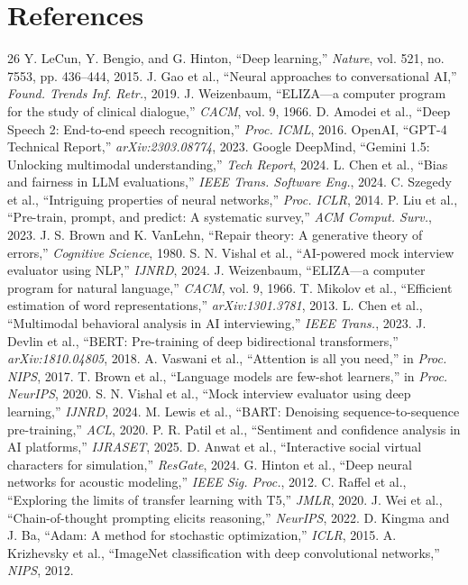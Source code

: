 \documentclass[conference]{IEEEtran}
\begin{document}
\section{References}
\begin{thebibliography}{26}
 Y. LeCun, Y. Bengio, and G. Hinton, ``Deep learning,'' \textit{Nature}, vol. 521, no. 7553, pp. 436--444, 2015.
 J. Gao et al., ``Neural approaches to conversational AI,'' \textit{Found. Trends Inf. Retr.}, 2019.
 J. Weizenbaum, ``ELIZA---a computer program for the study of clinical dialogue,'' \textit{CACM}, vol. 9, 1966.
 D. Amodei et al., ``Deep Speech 2: End-to-end speech recognition,'' \textit{Proc. ICML}, 2016.
 OpenAI, ``GPT-4 Technical Report,'' \textit{arXiv:2303.08774}, 2023.
 Google DeepMind, ``Gemini 1.5: Unlocking multimodal understanding,'' \textit{Tech Report}, 2024.
 L. Chen et al., ``Bias and fairness in LLM evaluations,'' \textit{IEEE Trans. Software Eng.}, 2024.
 C. Szegedy et al., ``Intriguing properties of neural networks,'' \textit{Proc. ICLR}, 2014.
 P. Liu et al., ``Pre-train, prompt, and predict: A systematic survey,'' \textit{ACM Comput. Surv.}, 2023.
 J. S. Brown and K. VanLehn, ``Repair theory: A generative theory of errors,'' \textit{Cognitive Science}, 1980.
 S. N. Vishal et al., ``AI-powered mock interview evaluator using NLP,'' \textit{IJNRD}, 2024.
 J. Weizenbaum, ``ELIZA---a computer program for natural language,'' \textit{CACM}, vol. 9, 1966.
 T. Mikolov et al., ``Efficient estimation of word representations,'' \textit{arXiv:1301.3781}, 2013.
 L. Chen et al., ``Multimodal behavioral analysis in AI interviewing,'' \textit{IEEE Trans.}, 2023.
 J. Devlin et al., ``BERT: Pre-training of deep bidirectional transformers,'' \textit{arXiv:1810.04805}, 2018.
 A. Vaswani et al., ``Attention is all you need,'' in \textit{Proc. NIPS}, 2017.
 T. Brown et al., ``Language models are few-shot learners,'' in \textit{Proc. NeurIPS}, 2020.
 S. N. Vishal et al., ``Mock interview evaluator using deep learning,'' \textit{IJNRD}, 2024.
 M. Lewis et al., ``BART: Denoising sequence-to-sequence pre-training,'' \textit{ACL}, 2020.
 P. R. Patil et al., ``Sentiment and confidence analysis in AI platforms,'' \textit{IJRASET}, 2025.
 D. Anwat et al., ``Interactive social virtual characters for simulation,'' \textit{ResGate}, 2024.
 G. Hinton et al., ``Deep neural networks for acoustic modeling,'' \textit{IEEE Sig. Proc.}, 2012.
 C. Raffel et al., ``Exploring the limits of transfer learning with T5,'' \textit{JMLR}, 2020.
 J. Wei et al., ``Chain-of-thought prompting elicits reasoning,'' \textit{NeurIPS}, 2022.
 D. Kingma and J. Ba, ``Adam: A method for stochastic optimization,'' \textit{ICLR}, 2015.
 A. Krizhevsky et al., ``ImageNet classification with deep convolutional networks,'' \textit{NIPS}, 2012.
\end{thebibliography}
\end{document}
